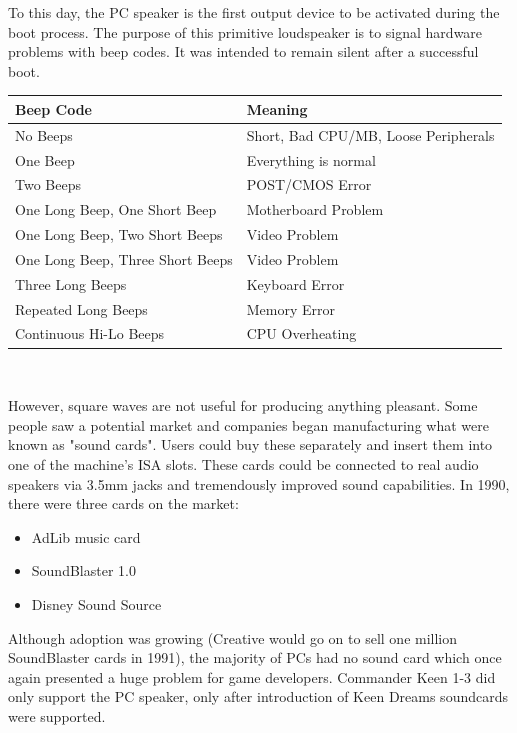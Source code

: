 \documentclass[book.tex]{subfiles}
\begin{document}
\par
 To this day, the PC speaker is the first output device to be activated during the boot process. The purpose of this primitive loudspeaker is to signal hardware problems with beep codes. It was intended to remain silent after a successful boot.\\
\par
\begin{tabularx}{\textwidth}{l l}
\textbf{Beep Code} & \textbf{Meaning}  \\ \hline
No Beeps                         & Short, Bad CPU/MB, Loose Peripherals \\ \hline
One Beep                         & Everything is normal\\ \hline
Two Beeps                        & POST/CMOS Error \\ \hline 
One Long Beep, One Short Beep    & Motherboard Problem \\ \hline
One Long Beep, Two Short Beeps   & Video Problem \\ \hline
One Long Beep, Three Short Beeps & Video Problem \\ \hline
Three Long Beeps                 & Keyboard Error \\ \hline
Repeated Long Beeps              & Memory Error \\ \hline
Continuous Hi-Lo Beeps           & CPU Overheating \\ \hline
\end{tabularx}\\
\bigskip
\par
However, square waves are not useful for producing anything pleasant. Some people saw a potential market and companies began manufacturing what were known as "sound cards". Users could buy these separately and insert them into one of the machine's ISA slots. These cards could be connected to real audio speakers via 3.5mm jacks and tremendously improved sound capabilities. In 1990, there were three cards on the market:\\
\par
\begin{itemize}
\item AdLib music card
\item SoundBlaster 1.0
\item Disney Sound Source
\end{itemize}
\par
Although adoption was growing (Creative would go on to sell one million SoundBlaster cards in 1991), the majority of PCs had no sound card which once again presented a huge problem for game developers. Commander Keen 1-3 did only support the PC speaker, only after introduction of Keen Dreams soundcards were supported.
\end{document}
